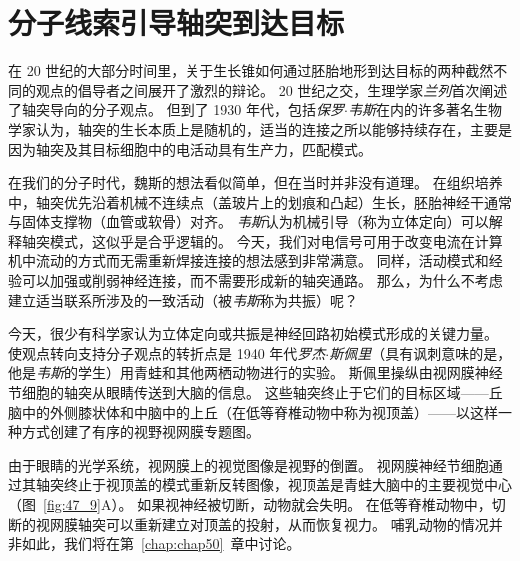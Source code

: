 \section{分子线索引导轴突到达目标}

在 20 世纪的大部分时间里，关于生长锥如何通过胚胎地形到达目标的两种截然不同的观点的倡导者之间展开了激烈的辩论。
20 世纪之交，生理学家\textit{兰列}首次阐述了轴突导向的分子观点。
但到了 1930 年代，包括\textit{保罗$\cdot$韦斯}在内的许多著名生物学家认为，轴突的生长本质上是随机的，适当的连接之所以能够持续存在，主要是因为轴突及其目标细胞中的电活动具有生产力，匹配模式。


在我们的分子时代，魏斯的想法看似简单，但在当时并非没有道理。
在组织培养中，轴突优先沿着机械不连续点（盖玻片上的划痕和凸起）生长，胚胎神经干通常与固体支撑物（血管或软骨）对齐。
\textit{韦斯}认为机械引导（称为立体定向）可以解释轴突模式，这似乎是合乎逻辑的。
今天，我们对电信号可用于改变电流在计算机中流动的方式而无需重新焊接连接的想法感到非常满意。
同样，活动模式和经验可以加强或削弱神经连接，而不需要形成新的轴突通路。
那么，为什么不考虑建立适当联系所涉及的一致活动（被\textit{韦斯}称为共振）呢？


今天，很少有科学家认为立体定向或共振是神经回路初始模式形成的关键力量。
使观点转向支持分子观点的转折点是 1940 年代\textit{罗杰$\cdot$斯佩里}（具有讽刺意味的是，他是\textit{韦斯}的学生）用青蛙和其他两栖动物进行的实验。
斯佩里操纵由视网膜神经节细胞的轴突从眼睛传送到大脑的信息。
这些轴突终止于它们的目标区域——丘脑中的外侧膝状体和中脑中的上丘（在低等脊椎动物中称为视顶盖）——以这样一种方式创建了有序的视野视网膜专题图。


由于眼睛的光学系统，视网膜上的视觉图像是视野的倒置。
视网膜神经节细胞通过其轴突终止于视顶盖的模式重新反转图像，视顶盖是青蛙大脑中的主要视觉中心（图~\ref{fig:47_9}A）。
如果视神经被切断，动物就会失明。
在低等脊椎动物中，切断的视网膜轴突可以重新建立对顶盖的投射，从而恢复视力。
哺乳动物的情况并非如此，我们将在第~\ref{chap:chap50}~章中讨论。


